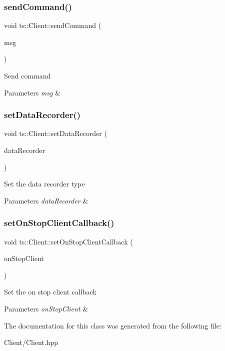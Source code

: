 \subsubsection{\texorpdfstring{send\+Command()}{sendCommand()}}
{\footnotesize\ttfamily void ts\+::\+Client\+::send\+Command (\begin{DoxyParamCaption}\item[{std\+::string const \&}]{msg }\end{DoxyParamCaption})}

Send command 
\begin{DoxyParams}{Parameters}
{\em msg} & \\
\hline
\end{DoxyParams}
\mbox{\label{classts_1_1_client_a4fd19e3b8dae284cd0f30bf7bd525720}} 
\subsubsection{\texorpdfstring{set\+Data\+Recorder()}{setDataRecorder()}}
{\footnotesize\ttfamily void ts\+::\+Client\+::set\+Data\+Recorder (\begin{DoxyParamCaption}\item[{std\+::shared\+\_\+ptr$<$ \hyperlink{classts_1_1_i_data_recorder}{I\+Data\+Recorder} $>$}]{data\+Recorder }\end{DoxyParamCaption})}

Set the data recorder type 
\begin{DoxyParams}{Parameters}
{\em data\+Recorder} & \\
\hline
\end{DoxyParams}
\mbox{\label{classts_1_1_client_a524c5585285a81de781fc7e1d1cd3a16}} 
\subsubsection{\texorpdfstring{set\+On\+Stop\+Client\+Callback()}{setOnStopClientCallback()}}
{\footnotesize\ttfamily void ts\+::\+Client\+::set\+On\+Stop\+Client\+Callback (\begin{DoxyParamCaption}\item[{std\+::function$<$ void(boost\+::shared\+\_\+ptr$<$ \hyperlink{classts_1_1_client}{Client} $>$ client)$>$}]{on\+Stop\+Client }\end{DoxyParamCaption})}

Set the on stop client callback 
\begin{DoxyParams}{Parameters}
{\em on\+Stop\+Client} & \\
\hline
\end{DoxyParams}


The documentation for this class was generated from the following file\+:\begin{DoxyCompactItemize}
\item 
Client/Client.\+hpp\end{DoxyCompactItemize}
